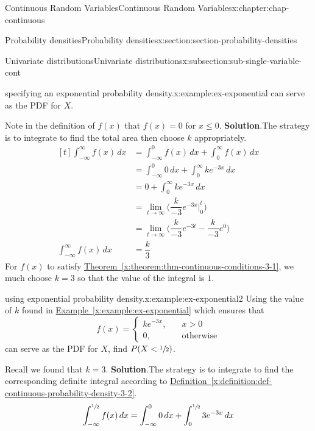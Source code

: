 \documentclass[oneside,10pt,]{book}
\newcommand{\blocktitlefont}{\relax}
\newcommand{\xreffont}{\relax}
\newcommand{\lt}{<}
\newcommand{\gt}{>}
\newcommand{\amp}{&}
\begin{document}
\begin{chapterptx}{Continuous Random Variables}{}{Continuous Random Variables}{}{}{x:chapter:chap-continuous}
\begin{sectionptx}{Probability densities}{}{Probability densities}{}{}{x:section:section-probability-densities}
\begin{subsectionptx}{Univariate distributions}{}{Univariate distributions}{}{}{x:subsection:sub-single-variable-cont}
\begin{example}{specifying an exponential probability density.}{x:example:ex-exponential}
can serve as the PDF for \(X\).%
\par
Note in the definition of \(f(x)\) that \(f(x) = 0\) for \(x
\le 0\).%
\textbf{\blocktitlefont Solution}.\quad{}The strategy is to integrate to find the total area then choose \(k\) appropriately.%
\begin{equation*}
\begin{aligned}[t]
\int_{-\infty}^\infty f(x)\,dx \amp = \int_{-\infty}^0 f(x)\,dx +
\int_{0}^\infty f(x)\,dx \\
\amp = \int_{-\infty}^0 0\,dx + \int_{0}^\infty ke^{-3x}\,dx \\
\amp = 0 + \int_{0}^\infty ke^{-3x}\,dx \\
\amp = \lim_{t\to\infty} \Big(\dfrac{k}{-3}e^{-3x}\Big|_0^t\Big) \\
\amp = \lim_{t\to\infty} \Big(\dfrac{k}{-3}e^{-3t} - \dfrac{k}{-3}e^{0}
\Big) \\
\int_{-\infty}^\infty f(x)\,dx\amp = \dfrac{k}{3}
\end{aligned}
\end{equation*}
For \(f(x)\) to satisfy \hyperref[x:theorem:thm-continuous-conditions-3-1]{Theorem~{\xreffont\ref{x:theorem:thm-continuous-conditions-3-1}}}, we much choose \(k=3\) so that the value of the integral is \(1\).%
\end{example}
\begin{example}{using exponential probability density.}{x:example:ex-exponential2}%
Using the value of \(k\) found in \hyperref[x:example:ex-exponential]{Example~{\xreffont\ref{x:example:ex-exponential}}} which ensures that%
\begin{equation*}
f(x) = \begin{cases}ke^{-3x},\amp \quad x \gt 0\\
0,
\amp \quad \text{otherwise}\end{cases}
\end{equation*}
can serve as the PDF for \(X\), find \(P(X \lt \sfrac{1}{2})\).%
\par
Recall we found that \(k=3\).%
\textbf{\blocktitlefont Solution}.\quad{}The strategy is to integrate to find the corresponding definite integral according to \hyperref[x:definition:def-continuous-probability-density-3-2]{Definition~{\xreffont\ref{x:definition:def-continuous-probability-density-3-2}}}.%
\begin{equation*}
\begin{aligned}[t]
\int_{-\infty}^{\sfrac{1}{2}} f(x)\,dx \amp = \int_{-\infty}^0 0\,dx +
\int_{0}^{\sfrac{1}{2}} 3e^{-3x}\,dx \\

\end{aligned}
\end{equation*}
\end{example}
\end{subsectionptx}
\end{sectionptx}
\end{chapterptx}
\end{document}
